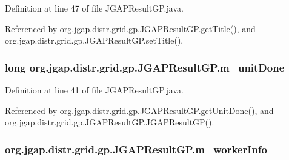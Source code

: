 Definition at line 47 of file J\-G\-A\-P\-Result\-G\-P.\-java.



Referenced by org.\-jgap.\-distr.\-grid.\-gp.\-J\-G\-A\-P\-Result\-G\-P.\-get\-Title(), and org.\-jgap.\-distr.\-grid.\-gp.\-J\-G\-A\-P\-Result\-G\-P.\-set\-Title().

\hypertarget{classorg_1_1jgap_1_1distr_1_1grid_1_1gp_1_1_j_g_a_p_result_g_p_a90e49128a780de5ea93cbfa6df929c60}{
\subsubsection[{m\-\_\-unit\-Done}]{\setlength{\rightskip}{0pt plus 5cm}long org.\-jgap.\-distr.\-grid.\-gp.\-J\-G\-A\-P\-Result\-G\-P.\-m\-\_\-unit\-Done\hspace{0.3cm}{\ttfamily [private]}}}\label{classorg_1_1jgap_1_1distr_1_1grid_1_1gp_1_1_j_g_a_p_result_g_p_a90e49128a780de5ea93cbfa6df929c60}


Definition at line 41 of file J\-G\-A\-P\-Result\-G\-P.\-java.



Referenced by org.\-jgap.\-distr.\-grid.\-gp.\-J\-G\-A\-P\-Result\-G\-P.\-get\-Unit\-Done(), and org.\-jgap.\-distr.\-grid.\-gp.\-J\-G\-A\-P\-Result\-G\-P.\-J\-G\-A\-P\-Result\-G\-P().

\hypertarget{classorg_1_1jgap_1_1distr_1_1grid_1_1gp_1_1_j_g_a_p_result_g_p_a3c9a9cf7dbe280925746aa02cf89e488}{
\subsubsection[{m\-\_\-worker\-Info}]{ org.\-jgap.\-distr.\-grid.\-gp.\-J\-G\-A\-P\-Result\-G\-P.\-m\-\_\-worker\-Info\hspace{0.3cm}{\ttfamily [private]}}}\label{classorg_1_1jgap_1_1distr_1_1grid_1_1gp_1_1_j_g_a_p_result_g_p_a3c9a9cf7dbe280925746aa02cf89e488}


